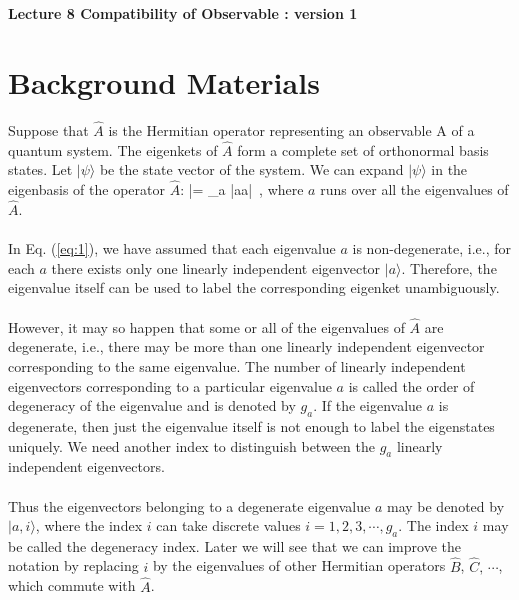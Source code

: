 
\setcounter{chapter}{8}
\noindent
\begin{Large}
{\bf Lecture 8 \newline
Compatibility of Observable : version 1}
\end{Large}

\section{Background Materials}
Suppose that $\hat{A}$ is the Hermitian operator representing an observable A of a quantum system. The eigenkets of ${\hat A}$
form a complete set of orthonormal basis states. Let $|\psi\rangle$ be the state vector of the system. We can expand 
$|\psi\rangle$ in the eigenbasis of the operator ${\hat A}$:
\be
|\psi\rangle = \sum_a |a\rangle \langle a|\psi\rangle \, , 
\label{eq:1}
\ee
where $a$ runs over all the eigenvalues of ${\hat A}$.


\paragraph{}
In Eq. (\ref{eq:1}), we have assumed that each eigenvalue $a$ is non-degenerate, i.e., for each $a$ there exists only one linearly independent eigenvector $|a\rangle$. Therefore, the eigenvalue itself can be used to label the corresponding eigenket unambiguously.

\paragraph{}
However, it may so happen that some or all of the eigenvalues of ${\hat A}$ are degenerate, i.e., there may be more than one linearly independent eigenvector corresponding to the same eigenvalue. The number of linearly independent eigenvectors corresponding
to a particular eigenvalue $a$ is called the order of degeneracy of the eigenvalue and is denoted by $g_a$. If the eigenvalue $a$ is degenerate, then just the eigenvalue itself is not enough to label the eigenstates uniquely. We need another index to distinguish between the $g_a$ linearly independent eigenvectors.

\paragraph{}
Thus the eigenvectors belonging to a degenerate eigenvalue $a$ may be denoted by $|a,i\rangle$, where the index $i$ 
can take discrete values $i=1,2,3, \cdots , g_a$. The index $i$ may be called the degeneracy index. Later we will see that we can improve the notation by replacing $i$ by the eigenvalues of other Hermitian operators $\hat{B}$, $\hat{C},\, \cdots$, which commute
with $\hat{A}$. 

